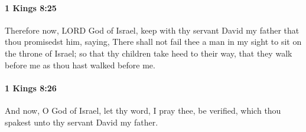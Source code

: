 		\paragraph{1 Kings 8:25} %
			\label{1KINGS-8-25}

			Therefore now, LORD God of Israel, keep with thy servant David my father that thou promisedst him, saying, There shall not fail thee a man in my sight to sit on the throne of Israel; so that thy children take heed to their way, that they walk before me as thou hast walked before me.


		\paragraph{1 Kings 8:26} %
			\label{1KINGS-8-26}

			And now, O God of Israel, let thy word, I pray thee, be verified, which thou spakest unto thy servant David my father.

